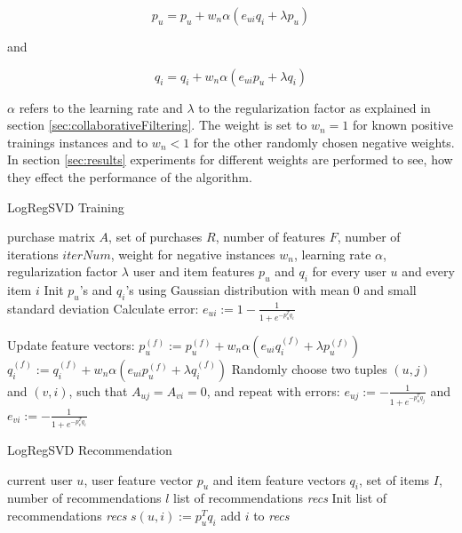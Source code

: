 \documentclass[10pt]{reportMaster}
\begin{document}
\begin{equation}
\label{eq:updateLogRegP}
	p_u = p_u + w_n \alpha (e_{ui} q_i + \lambda p_u)
\end{equation}

and 

\begin{equation}
\label{eq:updateLogRegQ}
	q_i = q_i + w_n \alpha (e_{ui} p_u + \lambda q_i)
\end{equation}

$\alpha$ refers to the learning rate and $\lambda$ to the regularization factor as explained in section \ref{sec:collaborativeFiltering}.
The weight is set to $w_n = 1$ for known positive trainings instances and to $w_n < 1$ for the other randomly chosen negative weights.
In section \ref{sec:results} experiments for different weights are performed to see, how they effect the performance of the algorithm.

\begin{algorithm}
	\caption[LogRegSVD Training]{LogRegSVD Training}
	\label{alg:LogRegSVDTraining}
	\begin{algorithmic}[1]
		\Require purchase matrix $A$, set of purchases $R$, number of features $F$, number of iterations $iterNum$, weight for negative instances $w_n$, learning rate $\alpha$, regularization factor $\lambda$
		\Ensure user and item features $p_u$ and $q_i$ for every user $u$ and every item $i$
		\State Init $p_u$'s and $q_i$'s using Gaussian distribution with mean $0$ and small standard deviation
				\State Calculate error:
				\State $e_{ui} := 1 - \frac{1}{1 + e^{-p_u^Tq_i}}$
				
				\State Update feature vectors:
					\State $p_u^{(f)} := p_u^{(f)} + w_n \alpha (e_{ui} q_i^{(f)} + \lambda p_u^{(f)})$
					\State $q_i^{(f)} := q_i^{(f)} + w_n \alpha (e_{ui} p_u^{(f)} + \lambda q_i^{(f)})$
				\EndFor	
				\State Randomly choose two tuples $(u,j)$ and $(v,i)$, such that $A_{uj} = A_{vi} = 0$, and repeat with errors: 
				\State $e_{uj} := - \frac{1}{1 + e^{-p_u^Tq_j}}$ and
				\State $e_{vi} := - \frac{1}{1 + e^{-p_v^Tq_i}}$
			\EndFor
		\EndFor
	\end{algorithmic}	
\end{algorithm}


\begin{algorithm}
	\caption[LogRegSVD Recommendation]{LogRegSVD Recommendation}
	\label{alg:LogRegSVDRecommendation}
	\begin{algorithmic}[1]
		\Require current user $u$, user feature vector $p_u$ and item feature vectors $q_i$, set of items $I$, number of recommendations $l$
		\Ensure list of recommendations \textit{recs}
		\State Init list of recommendations \textit{recs}
			\State $s(u,i) := p_u^Tq_i$
			\State add $i$ to \textit{recs}
			\EndIf
		\EndFor
	\end{algorithmic}	
\end{algorithm}
\end{document}
